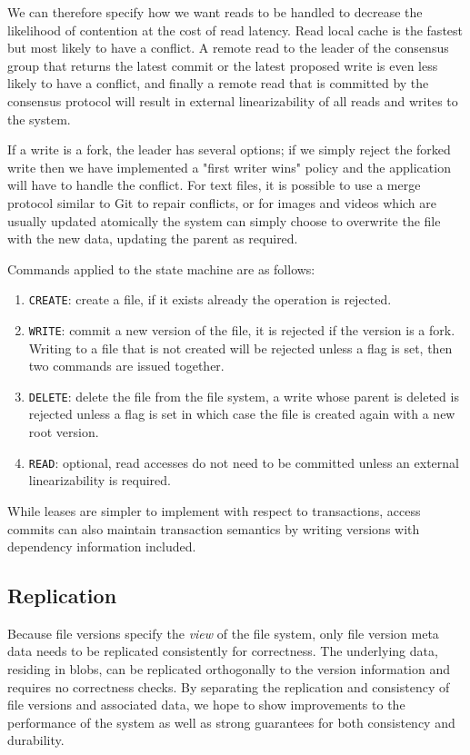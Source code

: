\documentclass[letterpaper,twocolumn,10pt]{article}
\begin{document}
We can therefore specify how we want reads to be handled to decrease the
likelihood of contention at the cost of read latency.
Read local cache is the fastest but most likely to have a conflict.
A remote read to the leader of the consensus group that returns the latest
commit or the latest proposed write is even less likely to have a conflict,
and finally a remote read that is committed by the consensus protocol will
result in external linearizability of all reads and writes to the system.

If a write is a fork, the leader has several options; if we simply reject the
forked write then we have implemented a "first writer wins" policy and the
application will have to handle the conflict.
For text files, it is possible to use a merge protocol similar to Git to
repair conflicts, or for images and videos which are usually updated
atomically the system can simply choose to overwrite the file with the new
data, updating the parent as required.

Commands applied to the state machine are as follows:

\begin{enumerate}
    \item \texttt{CREATE}: create a file, if it exists already the operation
    is rejected.
    \item \texttt{WRITE}: commit a new version of the file, it is rejected if
    the version is a fork. Writing to a file that is not created will be
    rejected unless a flag is set, then two commands are issued together.
    \item \texttt{DELETE}: delete the file from the file system, a write
    whose parent is deleted is rejected unless a flag is set in which case
    the file is created again with a new root version.
    \item \texttt{READ}: optional, read accesses do not need to be committed
    unless an external linearizability is required.
\end{enumerate}

While leases are simpler to implement with respect to transactions, access
commits can also maintain transaction semantics by writing versions with
dependency information included.

\subsection*{Replication}

Because file versions specify the \textit{view} of the file system, only
file version meta data needs to be replicated consistently for correctness.
The underlying data, residing in blobs, can be replicated orthogonally to the
version information and requires no correctness checks.
By separating the replication and consistency of file versions and associated
data, we hope to show improvements to the performance of the system as well
as strong guarantees for both consistency and durability.
\end{document}
